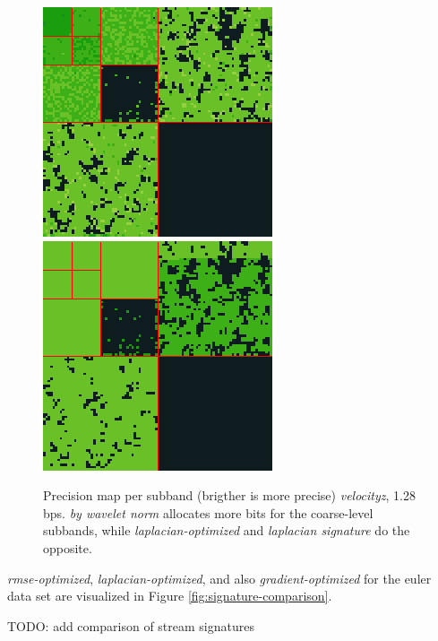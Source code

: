 \begin{figure}[h]
	{\includegraphics[width=0.32\linewidth]{img/laplacian/laplacian-optimized.png}}
	{\includegraphics[width=0.32\linewidth]{img/laplacian/gradient-signature.png}}
	\caption{Precision map per subband (brigther is more precise) \emph{velocityz}, 1.28 bps. \emph{by wavelet norm} allocates more bits for the coarse-level subbands, while \emph{laplacian-optimized} and \emph{laplacian signature} do the opposite.}
	\label{fig:laplacian-precision-comparison}
\end{figure}

\emph{rmse-optimized}, \emph{laplacian-optimized}, and also \emph{gradient-optimized} for the euler
data set are visualized in Figure \ref{fig:signature-comparison}. 

TODO: add comparison of stream signatures

